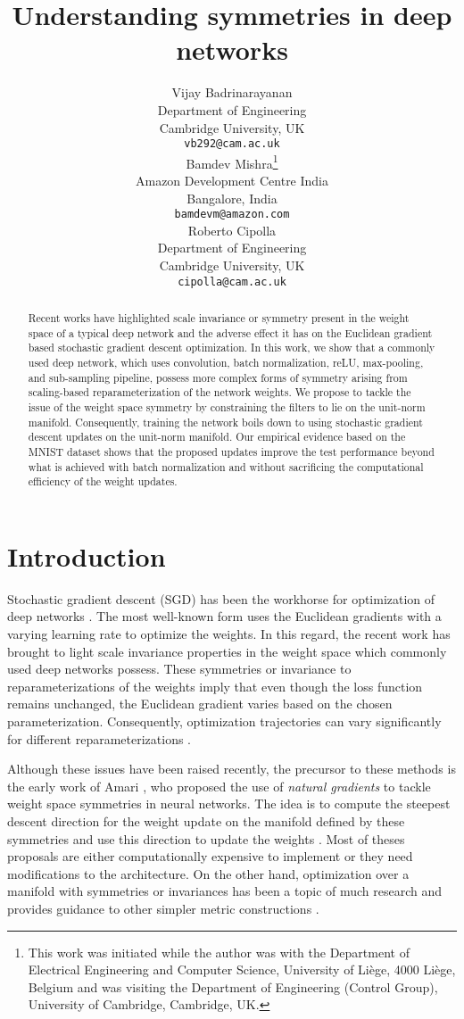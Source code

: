 \documentclass{article} %
\title{Understanding symmetries in deep networks}
\author{Vijay Badrinarayanan\\
Department of Engineering\\
Cambridge University, UK\\
\texttt{\small vb292@cam.ac.uk}\\
\And
Bamdev Mishra\thanks{This work was initiated while the author was with the Department of Electrical Engineering and Computer Science, University of Li\`ege, 4000 Li\`ege, Belgium and was visiting the Department of Engineering (Control Group), University of Cambridge, Cambridge, UK.}\\
Amazon Development Centre India\\
Bangalore, India\\
\texttt{\small bamdevm@amazon.com}\\
\And
Roberto Cipolla\\
Department of Engineering\\
Cambridge University, UK\\
\texttt{\small cipolla@cam.ac.uk}
}
\newcommand{\changeBM}[1]{#1} %
\newcommand{\changeVB}[1]{#1} %
\begin{document}
\maketitle

\begin{abstract}
\changeBM{Recent works} have highlighted scale invariance or symmetry present in the weight space of a typical deep network and the adverse effect it has on the Euclidean gradient based stochastic gradient descent optimization. In this work, we show that a commonly used deep network, which uses convolution, batch normalization, reLU, max-pooling, and sub-sampling pipeline, possess more complex forms of symmetry arising from scaling-based reparameterization of the network weights. \changeVB{We propose to tackle the issue of the weight space symmetry by constraining the filters to lie on the unit-norm manifold. \changeBM{Consequently, training the network boils down to using stochastic gradient descent updates on the unit-norm manifold.} Our empirical evidence based on the MNIST dataset shows that the \changeBM{proposed updates} improve the test performance beyond what is achieved with batch normalization and without sacrificing the \changeBM{computational} efficiency of the weight updates.} 

\end{abstract}

\section{Introduction}
Stochastic gradient descent (SGD) has been the workhorse for optimization of deep networks \cite{Bottou}. The most well-known form uses the Euclidean gradients with a varying learning rate to optimize the weights. In this regard, \changeBM{the} recent work \cite{PathSGD} has brought to light scale invariance properties in \changeBM{the} weight space which commonly used deep networks possess. These symmetries or \changeBM{invariance to} reparameterizations of the weights \changeBM{imply} that even though the \changeBM{loss function} remains \changeBM{unchanged}, the Euclidean gradient varies based on the chosen parameterization. \changeVB{Consequently, optimization trajectories can vary significantly for different reparameterizations \cite{PathSGD}.} 

Although these issues have been raised recently, the precursor to these methods is the early work of Amari \cite{Amari}, who proposed the use of \textit{natural gradients} to tackle weight space symmetries in neural networks. The idea is to compute the steepest descent direction for the weight update on the manifold defined by these symmetries and use this direction to update the weights \cite{PascanuNaturalGradient, DesjardinsNaturalNN, OllivierRiemmanianMetricsI, OllivierRiemmanianMetricsII}. \changeVB{Most of theses proposals are either computationally expensive to implement or they need modifications to the architecture.} \changeBM{On the other hand, optimization over a manifold with symmetries or invariances has been a topic of much research and provides guidance to other simpler metric constructions \cite{absil08a, mishra14b, boumal15a, journee10a, absil04b, edelman98a, manton02a}.}
\end{document}
